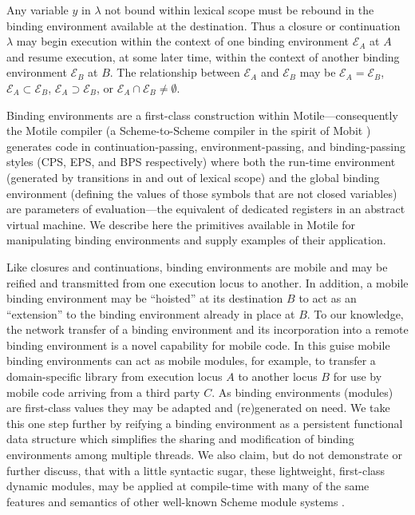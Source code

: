 \documentclass[11pt,peerreview]{IEEEtran}
\begin{document}
Any variable $y$ in $\lambda$ not bound within lexical scope must be rebound in the binding environment
available at the destination.
Thus a closure or continuation $\lambda$ may begin execution within the context of one binding environment
$\mathcal{E}_A$ at $A$ and resume execution, at some later time, within the context of another
binding environment $\mathcal{E}_B$ at $B$.
The relationship between $\mathcal{E}_A$ and $\mathcal{E}_B$ may be
$\mathcal{E}_A =         \mathcal{E}_B$,
$\mathcal{E}_A \subset \mathcal{E}_B$,
$\mathcal{E}_A \supset \mathcal{E}_B$, or
$\mathcal{E}_A \cap     \mathcal{E}_B \neq \emptyset$.

Binding environments are a first-class construction within Motile---consequently the Motile compiler
(a Scheme-to-Scheme compiler in the spirit of Mobit \cite{Mobit-2007})
generates code in continuation-passing, environment-passing, and binding-passing styles (CPS, EPS, and BPS respectively)
where both the run-time environment (generated by transitions in and out of lexical scope)
and the global binding environment (defining the values of those symbols that are not closed variables)
are parameters of evaluation---the equivalent of dedicated registers in an abstract virtual machine.
We describe here the primitives available in Motile for manipulating binding environments and supply examples
of their application.

Like closures and continuations, binding environments are mobile and may be reified and transmitted from one
execution locus to another.
In addition, a mobile binding environment may be ``hoisted''
at its destination $B$ to act as an ``extension'' to the binding environment already in place at $B$.
To our knowledge, the network transfer of a binding environment and its incorporation into a remote binding environment
is a novel capability for mobile code.
In this guise mobile binding environments can act as mobile modules, for example, to transfer a domain-specific
library from execution locus $A$ to another locus $B$ for use by mobile code arriving from a third party $C$.
As binding environments (modules) are first-class values they may be adapted and (re)generated on need.
We take this one step further by reifying a binding environment as a persistent functional data structure\cite{Okasaki-1998}
which simplifies the sharing and modification of binding environments among multiple threads.
We also claim, but do not demonstrate or further discuss, that
with a little syntactic sugar, these lightweight, first-class dynamic modules, may be applied at compile-time
with many of the same features and semantics of other well-known Scheme module systems \cite{Serrano-2010}.
\end{document}
